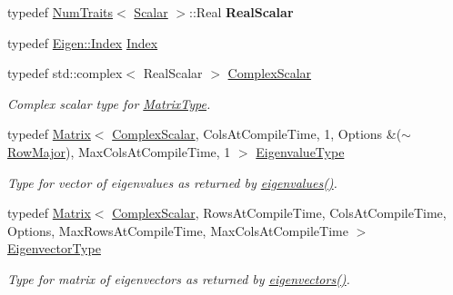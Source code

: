 \begin{DoxyCompactItemize}
\mbox{\label{group___eigenvalues___module_a7c2f4ce02837e653f92d40a3f3acad87}} 
typedef \hyperlink{group___core___module_struct_eigen_1_1_num_traits}{Num\+Traits}$<$ \hyperlink{group___eigenvalues___module_a61035d40c9498bb1d47628cdd4946785}{Scalar} $>$\+::Real {\bfseries Real\+Scalar}
\item 
typedef \hyperlink{namespace_eigen_a62e77e0933482dafde8fe197d9a2cfde}{Eigen\+::\+Index} \hyperlink{group___eigenvalues___module_abc0218d8b902af0d6c759bfc0a8a8d74}{Index}
\item 
typedef std\+::complex$<$ Real\+Scalar $>$ \hyperlink{group___eigenvalues___module_a3604c99a69fac3bee42c88cb2b589143}{Complex\+Scalar}
\begin{DoxyCompactList}\small\item\em Complex scalar type for \hyperlink{group___eigenvalues___module_ad61f6278843a601096276c9a72c0252f}{Matrix\+Type}. \end{DoxyCompactList}\item 
typedef \hyperlink{group___core___module_class_eigen_1_1_matrix}{Matrix}$<$ \hyperlink{group___eigenvalues___module_a3604c99a69fac3bee42c88cb2b589143}{Complex\+Scalar}, Cols\+At\+Compile\+Time, 1, Options \&($\sim$\hyperlink{group__enums_ggaacded1a18ae58b0f554751f6cdf9eb13acfcde9cd8677c5f7caf6bd603666aae3}{Row\+Major}), Max\+Cols\+At\+Compile\+Time, 1 $>$ \hyperlink{group___eigenvalues___module_ad3a663b1ff5200a098dabbbf9b7162b1}{Eigenvalue\+Type}
\begin{DoxyCompactList}\small\item\em Type for vector of eigenvalues as returned by \hyperlink{group___eigenvalues___module_a10c25c7620e7faedcd39991cce3a757b}{eigenvalues()}. \end{DoxyCompactList}\item 
typedef \hyperlink{group___core___module_class_eigen_1_1_matrix}{Matrix}$<$ \hyperlink{group___eigenvalues___module_a3604c99a69fac3bee42c88cb2b589143}{Complex\+Scalar}, Rows\+At\+Compile\+Time, Cols\+At\+Compile\+Time, Options, Max\+Rows\+At\+Compile\+Time, Max\+Cols\+At\+Compile\+Time $>$ \hyperlink{group___eigenvalues___module_a67cd4d20590abfd86b2639c4c8ea3dd6}{Eigenvector\+Type}
\begin{DoxyCompactList}\small\item\em Type for matrix of eigenvectors as returned by \hyperlink{group___eigenvalues___module_a3aa5e27800349990778da8fa532c1270}{eigenvectors()}. \end{DoxyCompactList}\item 

\end{DoxyCompactItemize}
